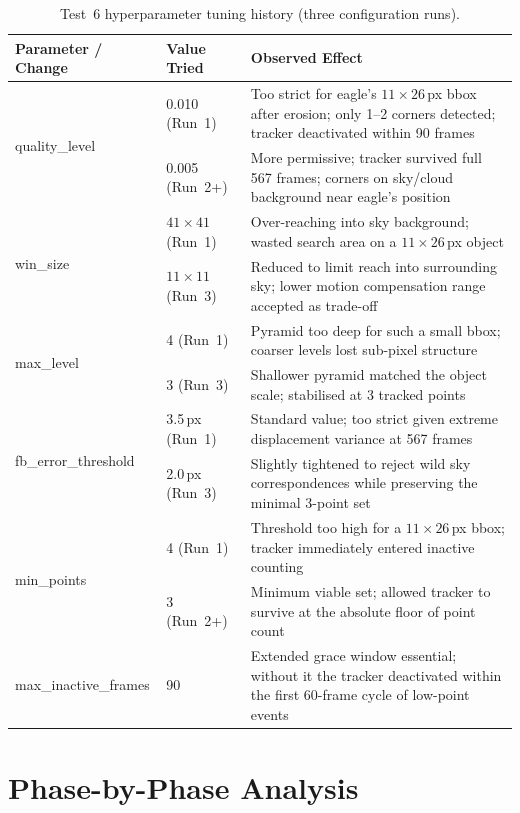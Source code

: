 \documentclass[12pt,a4paper]{article}
\begin{document}
\begin{table}[H]
\centering\small
\caption{Test~6 hyperparameter tuning history (three configuration runs).}
\label{tab:hyper6}
\begin{tabularx}{\textwidth}{llX}
\toprule
\rowcolor{accentteal!20}
\textbf{Parameter / Change} & \textbf{Value Tried} & \textbf{Observed Effect} \\
\midrule
\multirow{2}{*}{quality\_level}
 & 0.010 (Run~1) & Too strict for eagle's $11\times26$\,px bbox after erosion; only 1--2 corners detected; tracker deactivated within 90 frames \\
 & 0.005 (Run~2+) & More permissive; tracker survived full 567 frames; corners on sky/cloud background near eagle's position \\
\midrule
\multirow{2}{*}{win\_size}
 & $41\times41$ (Run~1) & Over-reaching into sky background; wasted search area on a $11\times26$\,px object \\
 & $11\times11$ (Run~3) & Reduced to limit reach into surrounding sky; lower motion compensation range accepted as trade-off \\
\midrule
\multirow{2}{*}{max\_level}
 & 4 (Run~1) & Pyramid too deep for such a small bbox; coarser levels lost sub-pixel structure \\
 & 3 (Run~3) & Shallower pyramid matched the object scale; stabilised at 3 tracked points \\
\midrule
\multirow{2}{*}{fb\_error\_threshold}
 & 3.5\,px (Run~1) & Standard value; too strict given extreme displacement variance at 567 frames \\
 & 2.0\,px (Run~3) & Slightly tightened to reject wild sky correspondences while preserving the minimal 3-point set \\
\midrule
\multirow{2}{*}{min\_points}
 & 4 (Run~1) & Threshold too high for a $11\times26$\,px bbox; tracker immediately entered inactive counting \\
 & 3 (Run~2+) & Minimum viable set; allowed tracker to survive at the absolute floor of point count \\
\midrule
max\_inactive\_frames & 90 & Extended grace window essential; without it the tracker deactivated within the first 60-frame cycle of low-point events \\
\bottomrule
\end{tabularx}
\end{table}

\section{Phase-by-Phase Analysis}
\end{document}
